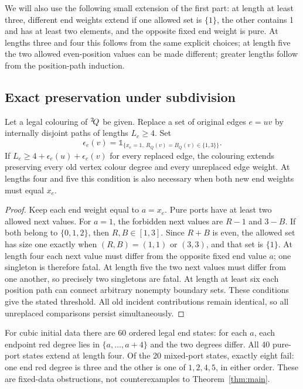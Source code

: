 We will also use the following small extension of the first part: at
length at least three, different end weights extend if one allowed set
is $\{1\}$, the other contains 1 and has at least two elements, and the
opposite fixed end weight is pure. At lengths three and four this
follows from the same explicit choices; at length five the two allowed
even-position values can be made different; greater lengths follow
from the position-path induction.

\subsection{Exact preservation under subdivision}\label{sec:preserve}

\begin{theorem}\label{thm:preserve}
Let a legal colouring of ${}^{2}\!Q$ be given. Replace a set of original
edges $e=uv$ by internally disjoint paths of lengths $L_e\ge4$. Set
\[
 \epsilon_e(v)=\mathbb{1}_{\{x_e=1,\ R_Q(v)=B_Q(v)\in\{1,3\}\}}.
\]
If $L_e\ge4+\epsilon_e(u)+\epsilon_e(v)$ for every replaced edge, the
colouring extends preserving every old vertex colour degree and every
unreplaced edge weight. At lengths four and five this condition is
also necessary when both new end weights must equal $x_e$.
\end{theorem}
\begin{proof}
Keep each end weight equal to $a=x_e$. Pure ports have at least two
allowed next values. For $a=1$, the forbidden next values are $R-1$
and $3-B$. If both belong to $\{0,1,2\}$, then $R,B\in[1,3]$.
Since $R+B$ is even, the allowed set has size one exactly when
$(R,B)=(1,1)$ or $(3,3)$, and that set is $\{1\}$. At length four
each next value must differ from the opposite fixed end value $a$;
one singleton is therefore fatal. At length five the two next values
must differ from one another, so precisely two singletons are fatal.
At length at least six each position path can connect arbitrary
nonempty boundary sets. These conditions give the stated threshold.
All old incident contributions remain identical, so all unreplaced
comparisons persist simultaneously.
\end{proof}

For cubic initial data there are 60 ordered legal end states: for each
$a$, each endpoint red degree lies in $\{a,\ldots,a+4\}$ and the two
degrees differ. All 40 pure-port states extend at length four. Of the
20 mixed-port states, exactly eight fail: one end red degree is three
and the other is one of $1,2,4,5$, in either order. These are fixed-data
obstructions, not counterexamples to Theorem~\ref{thm:main}.

